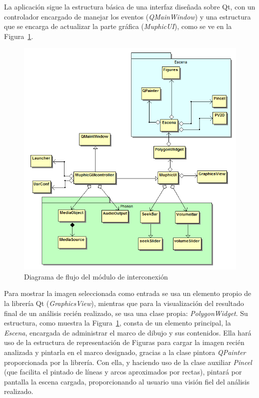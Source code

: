 La aplicación sigue la estructura básica de una interfaz diseñada sobre Qt, con un controlador encargado de manejar los eventos (\emph{QMainWindow}) y una estructura que se encarga de actualizar la parte gráfica (\emph{MuphicUI}), como se ve en la Figura~\ref{fig:gui-class-diagram}.\\

		\begin{figure}[!htbp]
		\centering
		\includegraphics[scale=0.6]{graphics/gui_diagrama_clases.png}
		\caption{Diagrama de flujo del módulo de interconexión}
		\label{fig:gui-class-diagram}
		\end{figure}

Para mostrar la imagen seleccionada como entrada se usa un elemento propio de la librería Qt (\emph{GraphicsView}), mientras que para la visualización del resultado final de un análisis recién realizado, se usa una clase propia: \emph{PolygonWidget}. Su estructura, como muestra la Figura~\ref{fig:gui-class-diagram}, consta de un elemento principal, la \emph{Escena}, encargada de administrar el marco de dibujo y sus contenidos. Ella hará uso de la estructura de representación de Figuras para cargar la imagen recién analizada y pintarla en el marco designado, gracias a la clase pintora \emph{QPainter} proporcionada por la librería. Con ella, y haciendo uso de la clase auxiliar \emph{Pincel} (que facilita el pintado de líneas y arcos aproximados por rectas), pintará por pantalla la escena cargada, proporcionando al usuario una visión fiel del análisis realizado.\\

